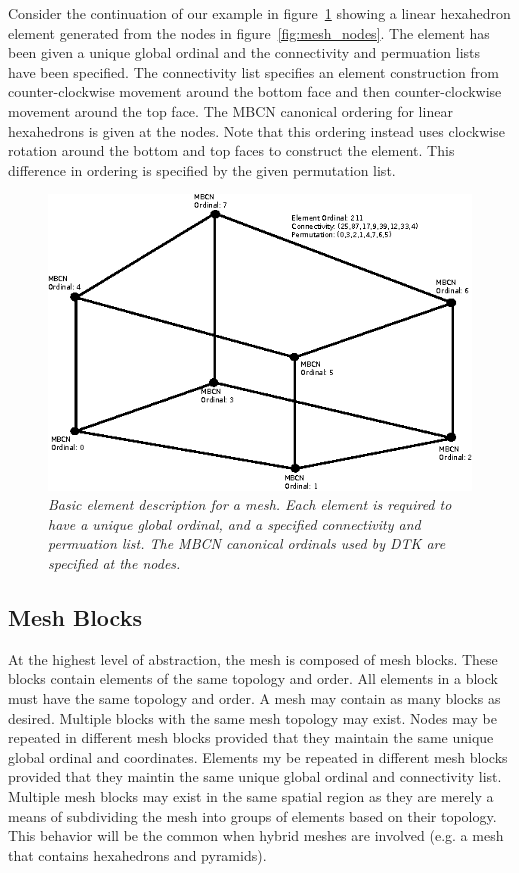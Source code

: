 \documentclass[letterpaper,12pt]{article}
\begin{document}
Consider the continuation of our example in
figure~\ref{fig:mesh_element} showing a linear hexahedron element
generated from the nodes in figure~\ref{fig:mesh_nodes}. The element
has been given a unique global ordinal and the connectivity and
permuation lists have been specified. The connectivity list specifies
an element construction from counter-clockwise movement around the
bottom face and then counter-clockwise movement around the top
face. The MBCN canonical ordering for linear hexahedrons is given at
the nodes. Note that this ordering instead uses clockwise rotation
around the bottom and top faces to construct the element. This
difference in ordering is specified by the given permutation list.

\begin{figure}[htpb!]
  \centering
  \includegraphics[width=5in]{hex_element.eps}
  \caption{\sl Basic element description for a mesh. Each element is
    required to have a unique global ordinal, and a specified
    connectivity and permuation list. The MBCN canonical ordinals used
    by DTK are specified at the nodes.}
  \label{fig:mesh_element}
\end{figure}

\subsection{Mesh Blocks}\label{subsec:blocks}
At the highest level of abstraction, the mesh is composed of mesh
blocks. These blocks contain elements of the same topology and
order. All elements in a block must have the same topology and
order. A mesh may contain as many blocks as desired. Multiple blocks
with the same mesh topology may exist. Nodes may be repeated in
different mesh blocks provided that they maintain the same unique
global ordinal and coordinates. Elements my be repeated in different
mesh blocks provided that they maintin the same unique global ordinal
and connectivity list. Multiple mesh blocks may exist in the same
spatial region as they are merely a means of subdividing the mesh into
groups of elements based on their topology. This behavior will be the
common when hybrid meshes are involved (e.g. a mesh that contains
hexahedrons and pyramids).
\end{document}
